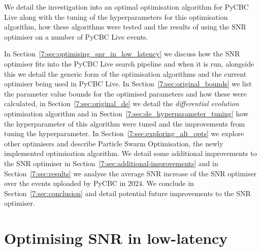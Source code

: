 We detail the investigation into an optimal optimisation algorithm for PyCBC Live along with the tuning of the hyperparameters for this optimisation algorithm, how these algorithms were tested and the results of using the SNR optimiser on a number of PyCBC Live events.





In Section~\ref{7:sec:optimising_snr_in_low_latency} we discuss how the SNR optimiser fits into the PyCBC Live search pipeline and when it is run, alongside this we detail the generic form of the optimisation algorithms and the current optimiser being used in PyCBC Live. In Section~\ref{7:sec:original_bounds} we list the parameter value bounds for the optimised parameters and how these were calculated, in Section~\ref{7:sec:original_de} we detail the \textit{differential evolution} optimisation algorithm and in Section~\ref{7:sec:de_hyperparameter_tuning} how the hyperparameter of this algorithm were tuned and the improvements from tuning the hyperparameter. In Section~\ref{7:sec:exploring_alt_opts} we explore other optimisers and describe Particle Swarm Optimisation, the newly implemented optimisation algorithm. We detail some additional improvements to the SNR optimiser in Section~\ref{7:sec:additional-improvements} and in Section~\ref{7:sec:results} we analyse the average SNR increase of the SNR optimiser over the events uploaded by PyCBC in 2024. We conclude in Section~\ref{7:sec:conclusion} and detail potential future improvements to the SNR optimiser.

\section{\label{7:sec:optimising_snr_in_low_latency}Optimising SNR in low-latency}

